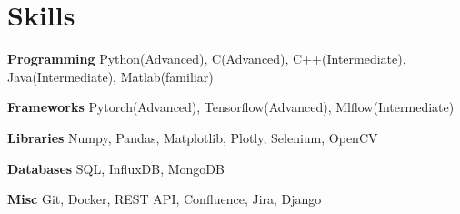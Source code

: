 
\section{Skills}
  \vspace{2pt}
  \resumeSubHeadingListStart
    \small{\item{

    \textbf{\color{MidnightBlue}Programming}{ Python(Advanced), C(Advanced), C++(Intermediate), Java(Intermediate), Matlab(familiar)} \\ \vspace{3pt}

    \textbf{\color{MidnightBlue}Frameworks}{ Pytorch(Advanced), Tensorflow(Advanced), Mlflow(Intermediate)} \\ \vspace{3pt}

    \textbf{\color{MidnightBlue}Libraries}{ Numpy, Pandas, Matplotlib, Plotly, Selenium, OpenCV} \\ \vspace{3pt}


    \textbf{\color{MidnightBlue}Databases}{ SQL, InfluxDB, MongoDB} \\ \vspace{3pt}

    \textbf{\color{MidnightBlue}Misc}{ Git, Docker, REST API, Confluence, Jira, Django} \\ \vspace{3pt}
            
    }}
  \resumeSubHeadingListEnd
